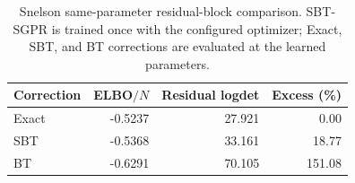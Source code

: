 \begin{table}[t]
\centering
\caption{Snelson same-parameter residual-block comparison. SBT-SGPR is trained once with the configured optimizer; Exact, SBT, and BT corrections are evaluated at the learned parameters.}
\label{tab:snelson-residual-sbt}
\begin{tabular}{lrrr}
\toprule
Correction & ELBO$/N$ & Residual logdet & Excess (\%) \\
\midrule
Exact & -0.5237 & 27.921 & 0.00 \\
SBT & -0.5368 & 33.161 & 18.77 \\
BT & -0.6291 & 70.105 & 151.08 \\
\bottomrule
\end{tabular}
\end{table}
